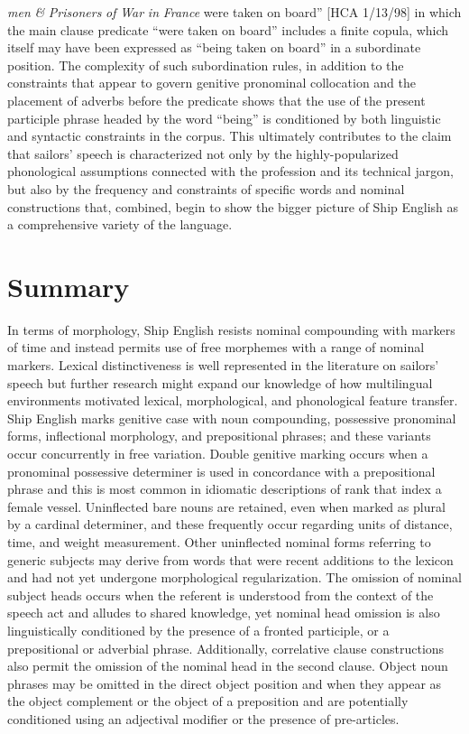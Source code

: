 \textit{men} \textit{\&} \textit{Prisoners} \textit{of} \textit{War} \textit{in} \textit{France} were taken on board” [HCA 1/13/98] in which the main clause predicate “were taken on board” includes a finite copula, which itself may have been expressed as “being taken on board” in a subordinate position. The complexity of such subordination rules, in addition to the constraints that appear to govern genitive pronominal collocation and the placement of adverbs before the predicate shows that the use of the present participle phrase headed by the word “being” is conditioned by both linguistic and syntactic constraints in the corpus. This ultimately contributes to the claim that sailors’ speech is characterized not only by the highly-popularized phonological assumptions connected with the profession and its technical jargon, but also by the frequency and constraints of specific words and nominal constructions that, combined, begin to show the bigger picture of Ship English as a comprehensive variety of the language.  

\section{\textbf{Summary} }%

In terms of morphology, Ship English resists nominal compounding with markers of time and instead permits use of free morphemes with a range of nominal markers. Lexical distinctiveness is well represented in the literature on sailors’ speech but further research might expand our knowledge of how multilingual environments motivated lexical, morphological, and phonological feature transfer. Ship English marks genitive case with noun compounding, possessive pronominal forms, inflectional morphology, and prepositional phrases; and these variants occur concurrently in free variation. Double genitive marking occurs when a pronominal possessive determiner is used in concordance with a prepositional phrase and this is most common in idiomatic descriptions of rank that index a female vessel. Uninflected bare nouns are retained, even when marked as plural by a cardinal determiner, and these frequently occur regarding units of distance, time, and weight measurement. Other uninflected nominal forms referring to generic subjects may derive from words that were recent additions to the lexicon and had not yet undergone morphological regularization. The omission of nominal subject heads occurs when the referent is understood from the context of the speech act and alludes to shared knowledge, yet nominal head omission is also linguistically conditioned by the presence of a fronted participle, or a prepositional or adverbial phrase. Additionally, correlative clause constructions also permit the omission of the nominal head in the second clause. Object noun phrases may be omitted in the direct object position and when they appear as the object complement or the object of a preposition and are potentially conditioned using an adjectival modifier or the presence of pre-articles.

